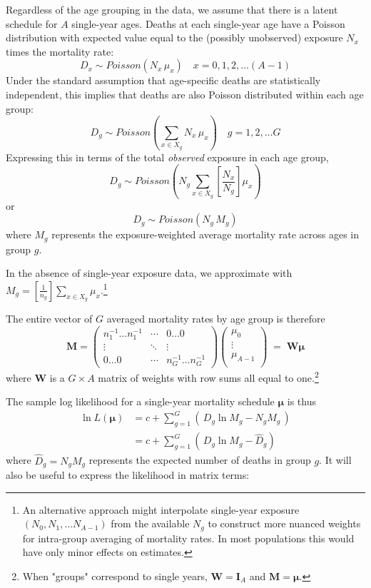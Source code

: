 \documentclass{article}
\begin{document}
Regardless of the age grouping in the data, we assume that there is a latent schedule for $A$ single-year ages. Deaths at each single-year age have a Poisson distribution with expected value equal to the (possibly unobserved) exposure $N_x$ times the mortality rate: 
$$
D_x \sim Poisson \left( N_x\,\mu_x \right)\quad x=0,1,2,\ldots (A-1)
$$
Under the standard assumption that age-specific deaths are statistically independent, this implies that deaths  are also Poisson distributed within each age group:
$$
D_g \sim Poisson \left( \sum_{x \in X_g} N_x \, \mu_x \right) \quad g=1,2,\ldots G
$$
Expressing this in terms of the total \textit{observed} exposure in each age group,
$$
D_g \sim Poisson \left( N_g \sum_{x \in X_g} \left[ \frac{N_x}{N_g} \right] \mu_x \right)
$$
or 
$$
D_g \sim Poisson \left( N_g\, M_g \right)
$$
where $M_g$ represents the exposure-weighted average mortality rate across ages in group $g$. 

In the absence of single-year exposure data, we approximate with $M_g = [\tfrac{1}{n_g}]\sum_{x \in X_g} \mu_x$.\footnote{
An alternative approach might interpolate single-year exposure $(N_0,N_1,\ldots N_{A-1})$ from the available $N_g$ to construct more nuanced weights for intra-group averaging of mortality rates. In most populations this would have only minor effects on estimates. 
}

\noindent The entire vector of $G$ averaged mortality rates by age group is therefore
$$
\boldsymbol{M} = 
\begin{pmatrix}
n_1^{-1}\ldots n_1^{-1} & \cdots & 0\ldots0 \\
\vdots  & \ddots & \vdots  \\
0\ldots0 & \cdots & n_G^{-1}\ldots n_G^{-1}
\end{pmatrix}
\begin{pmatrix}
\mu_0 \\
\vdots \\
\mu_{A-1} \\
\end{pmatrix} 
\;=\; \boldsymbol{W} \boldsymbol{\mu} 
$$
where $\boldsymbol{W}$ is a $G \times A$ matrix of weights with row sums all equal to one.\footnote{
When "groups" correspond to single years, $\boldsymbol{W}=\boldsymbol{I}_A$ and $\boldsymbol{M}=\boldsymbol{\mu}$.
} 

The sample log likelihood for a single-year mortality schedule $\boldsymbol{\mu}$ is thus
$$
\begin{aligned}
  \ln L(\boldsymbol{\mu}) &= c + \sum_{g=1}^{G} \left(\, D_g \ln M_g - N_g M_g\,\right) \\
   &= c + \sum_{g=1}^{G} \left(\, D_g \ln M_g - \hat{D}_g \right) 
\end{aligned}  
$$
where $\hat{D}_g=N_g M_g$ represents the expected number of deaths in group $g$. It will also be useful to express the likelihood in matrix terms:
\end{document}
